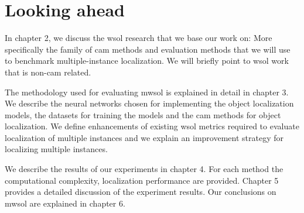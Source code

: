 \section{Looking ahead}
In chapter 2, we discuss the \acrshort{wsol} research that we base our work on: More specifically the family of \acrshort{cam} methods and evaluation methods that we will use to benchmark multiple-instance localization. We will briefly point to \acrshort{wsol} work that is  non-\acrshort{cam} related. 

The methodology used for evaluating \acrlong{mwsol} is explained in detail in chapter 3. We describe the neural networks chosen for implementing the object localization models, the datasets for training the models and the \acrshort{cam} methods for object localization. We define enhancements of existing \acrshort{wsol} metrics required to evaluate localization of multiple instances and we explain an improvement strategy for localizing multiple instances.

We describe the results of our experiments in chapter 4. For each method the computational complexity, localization performance are provided. Chapter 5 provides a detailed discussion of the experiment results. Our conclusions on \acrshort{mwsol} are explained in chapter 6.
